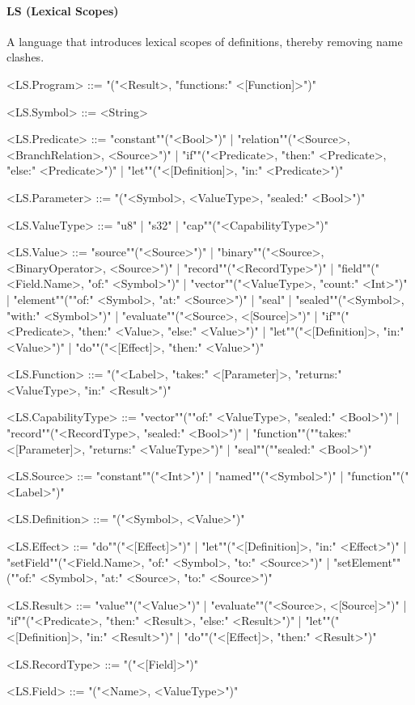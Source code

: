 \documentclass[main.tex]{subfiles}
\begin{document}
\paragraph{ LS (Lexical Scopes) } A language that introduces lexical scopes of definitions, thereby removing name clashes.
\begin{grammar}
	\footnotesize
				<LS.Program> ::=
							"("<Result>, "functions:" <[Function]>")"
				\par
				<LS.Symbol> ::=
						<String>
				\par
				<LS.Predicate> ::=
						"constant""("<Bool>")"
						| "relation""("<Source>, <BranchRelation>, <Source>")"
						| "if""("<Predicate>, "then:" <Predicate>, "else:" <Predicate>")"
						| "let""("<[Definition]>, "in:" <Predicate>")"
				\par
				<LS.Parameter> ::=
							"("<Symbol>, <ValueType>, "sealed:" <Bool>")"
				\par
				<LS.ValueType> ::=
						"u8"
						| "s32"
						| "cap""("<CapabilityType>")"
				\par
				<LS.Value> ::=
						"source""("<Source>")"
						| "binary""("<Source>, <BinaryOperator>, <Source>")"
						| "record""("<RecordType>")"
						| "field""("<Field.Name>, "of:" <Symbol>")"
						| "vector""("<ValueType>, "count:" <Int>")"
						| "element""(""of:" <Symbol>, "at:" <Source>")"
						| "seal"
						| "sealed""("<Symbol>, "with:" <Symbol>")"
						| "evaluate""("<Source>, <[Source]>")"
						| "if""("<Predicate>, "then:" <Value>, "else:" <Value>")"
						| "let""("<[Definition]>, "in:" <Value>")"
						| "do""("<[Effect]>, "then:" <Value>")"
				\par
				<LS.Function> ::=
							"("<Label>, "takes:" <[Parameter]>, "returns:" <ValueType>, "in:" <Result>")"
				\par
				<LS.CapabilityType> ::=
						"vector""(""of:" <ValueType>, "sealed:" <Bool>")"
						| "record""("<RecordType>, "sealed:" <Bool>")"
						| "function""(""takes:" <[Parameter]>, "returns:" <ValueType>")"
						| "seal""(""sealed:" <Bool>")"
				\par
				<LS.Source> ::=
						"constant""("<Int>")"
						| "named""("<Symbol>")"
						| "function""("<Label>")"
				\par
				<LS.Definition> ::=
							"("<Symbol>, <Value>")"
				\par
				<LS.Effect> ::=
						"do""("<[Effect]>")"
						| "let""("<[Definition]>, "in:" <Effect>")"
						| "setField""("<Field.Name>, "of:" <Symbol>, "to:" <Source>")"
						| "setElement""(""of:" <Symbol>, "at:" <Source>, "to:" <Source>")"
				\par
				<LS.Result> ::=
						"value""("<Value>")"
						| "evaluate""("<Source>, <[Source]>")"
						| "if""("<Predicate>, "then:" <Result>, "else:" <Result>")"
						| "let""("<[Definition]>, "in:" <Result>")"
						| "do""("<[Effect]>, "then:" <Result>")"
				\par
				<LS.RecordType> ::=
							"("<[Field]>")"
				\par
				<LS.Field> ::=
							"("<Name>, <ValueType>")"
				\par
\end{grammar}
\par
\end{document}
